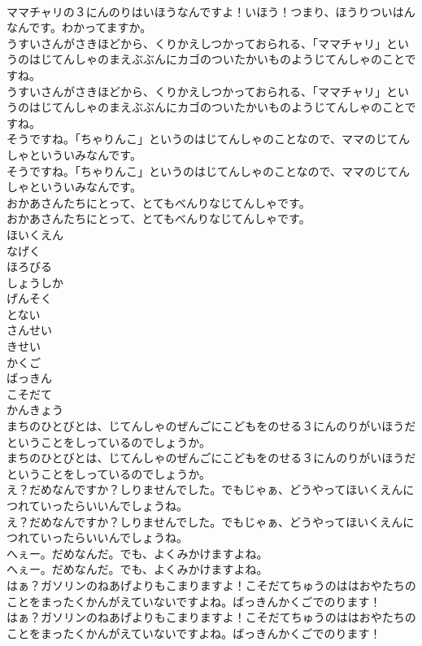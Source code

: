 \documentclass[8pt]{extreport}
\begin{document}
\begin{CJK}{UTF8}{min}
\\	ママチャリの３にんのりはいほうなんですよ！いほう！つまり、ほうりついはんなんです。わかってますか。
\\	うすいさんがさきほどから、くりかえしつかっておられる、「ママチャリ」というのはじてんしゃのまえぶぶんにカゴのついたかいものようじてんしゃのことですね。
\\	うすいさんがさきほどから、くりかえしつかっておられる、「ママチャリ」というのはじてんしゃのまえぶぶんにカゴのついたかいものようじてんしゃのことですね。
\\	そうですね。「ちゃりんこ」というのはじてんしゃのことなので、ママのじてんしゃといういみなんです。
\\	そうですね。「ちゃりんこ」というのはじてんしゃのことなので、ママのじてんしゃといういみなんです。
\\	おかあさんたちにとって、とてもべんりなじてんしゃです。
\\	おかあさんたちにとって、とてもべんりなじてんしゃです。
\\	ほいくえん
\\	なげく
\\	ほろびる
\\	しょうしか
\\	げんそく
\\	とない
\\	さんせい
\\	きせい
\\	かくご
\\	ばっきん
\\	こそだて
\\	かんきょう
\\	まちのひとびとは、じてんしゃのぜんごにこどもをのせる３にんのりがいほうだということをしっているのでしょうか。
\\	まちのひとびとは、じてんしゃのぜんごにこどもをのせる３にんのりがいほうだということをしっているのでしょうか。
\\	え？だめなんですか？しりませんでした。でもじゃぁ、どうやってほいくえんにつれていったらいいんでしょうね。
\\	え？だめなんですか？しりませんでした。でもじゃぁ、どうやってほいくえんにつれていったらいいんでしょうね。
\\	へぇー。だめなんだ。でも、よくみかけますよね。
\\	へぇー。だめなんだ。でも、よくみかけますよね。
\\	はぁ？ガソリンのねあげよりもこまりますよ！こそだてちゅうのははおやたちのことをまったくかんがえていないですよね。ばっきんかくごでのります！
\\	はぁ？ガソリンのねあげよりもこまりますよ！こそだてちゅうのははおやたちのことをまったくかんがえていないですよね。ばっきんかくごでのります！

\end{CJK}
\end{document}
